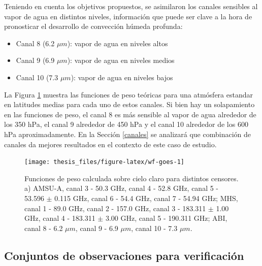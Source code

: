 \documentclass[12pt,oneside,a4paper]{reedthesis}
\providecommand{\tightlist}{%
  \setlength{\itemsep}{0pt}\setlength{\parskip}{0pt}}
\begin{document}
Teniendo en cuenta los objetivos propuestos, se asimilaron los canales sensibles al vapor de agua en distintos niveles, información que puede ser clave a la hora de pronosticar el desarrollo de convección húmeda profunda:
\begin{itemize}
\tightlist
\item
  Canal 8 (6.2 \(\mu m\)): vapor de agua en niveles altos
\item
  Canal 9 (6.9 \(\mu m\)): vapor de agua en niveles medios
\item
  Canal 10 (7.3 \(\mu m\)): vapor de agua en niveles bajos
\end{itemize}
La Figura \ref{fig:wf-goes} muestra las funciones de peso teóricas para una atmósfera estandar en latitudes medias para cada uno de estos canales. Si bien hay un solapamiento en las funciones de peso, el canal 8 es más sensible al vapor de agua alrededor de los 350 hPa, el canal 9 alrededor de 450 hPa y el canal 10 alrededor de los 600 hPa aproximadamente. En la Sección \ref{canales} se analizará que combinación de canales da mejores resultados en el contexto de este caso de estudio.
\begin{figure}

{\centering \texttt{[image: thesis\_files/figure-latex/wf-goes-1]} 

}

\caption{Funciones de peso calculada sobre cielo claro para distintos censores. a) AMSU-A, canal 3 - 50.3 GHz, canal 4 - 52.8 GHz, canal 5 - 53.596 \(\pm\) 0.115 GHz, canal 6 - 54.4 GHz, canal 7 - 54.94 GHz; MHS, canal 1 - 89.0 GHz, canal 2 - 157.0 GHz, canal 3 - 183.311 \(\pm\) 1.00 GHz, canal 4 - 183.311 \(\pm\) 3.00 GHz, canal 5 - 190.311 GHz; ABI, canal 8 - 6.2 \(\mu m\), canal 9 - 6.9 \(\mu m\), canal 10 - 7.3 \(\mu m\).}\label{fig:wf-goes}
\end{figure}
\hypertarget{conjuntos-de-observaciones-para-verificaciuxf3n}{%
\subsection{Conjuntos de observaciones para verificación}\label{conjuntos-de-observaciones-para-verificaciuxf3n}}
\end{document}
